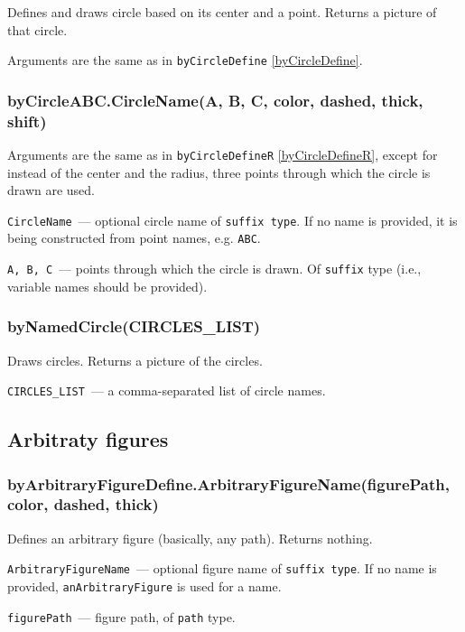 	Defines and draws circle based on its center and a point. Returns a picture of that circle.
	
	Arguments are the same as in \texttt{byCircleDefine} \ref{byCircleDefine}.

\subsubsection{byCircleABC.CircleName(A, B, C, color, dashed, thick, shift)}\label{byCircleABC}
	
	Arguments are the same as in \texttt{byCircleDefineR} \ref{byCircleDefineR}, except for instead of the center and the radius, three points through which the circle is drawn are used.
	
	\texttt{CircleName}~— optional circle name of \texttt{suffix type}. If no name is provided, it is being constructed from point names, e.g. \texttt{ABC}.
	
	\texttt{A, B, C}~— points through which the circle is drawn. Of \texttt{suffix} type (i.e., variable names should be provided).


\subsubsection{byNamedCircle(CIRCLES\_LIST)}\label{byNamedCircle}
	
	Draws circles. Returns a picture of the circles.
	
	\texttt{CIRCLES\_LIST}~— a comma-separated list of circle names.

\subsection{Arbitraty figures}

\subsubsection{byArbitraryFigureDefine.ArbitraryFigureName(figurePath, col\-or, dashed, thick)}\label{byArbitraryFigureDefine}
	
	Defines an arbitrary figure (basically, any path). Returns nothing.
	
	\texttt{ArbitraryFigureName}~— optional figure name of \texttt{suffix type}. If no name is provided, \texttt{anArbitraryFigure} is used for a name.
	
	\texttt{figurePath}~— figure path, of \texttt{path} type.
	
